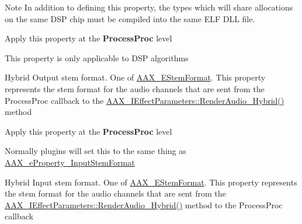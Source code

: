 \begin{Desc}
\begin{description}
\begin{DoxyNote}{Note}
In addition to defining this property, the types which will share allocations on the same D\+S\+P chip must be compiled into the same E\+L\+F D\+L\+L file.
\end{DoxyNote}
\begin{DoxyItemize}
\item Apply this property at the {\bfseries Process\+Proc} level \item This property is only applicable to D\+S\+P algorithms \end{DoxyItemize}
\item[{\em 
\hypertarget{a00283_ga6571f4e41a5dd06e4067249228e2249eac30a4e73772e37267dfef39ae3122705}{}A\+A\+X\+\_\+e\+Property\+\_\+\+Hybrid\+Output\+Stem\+Format\label{a00283_ga6571f4e41a5dd06e4067249228e2249eac30a4e73772e37267dfef39ae3122705}
}]Hybrid Output stem format. One of \hyperlink{a00206_ad8af5ef008b2bd478add9a0acb0a1d85}{A\+A\+X\+\_\+\+E\+Stem\+Format}. This property represents the stem format for the audio channels that are sent from the Process\+Proc callback to the \hyperlink{a00335_gae6139041de22f51f3146d26a01c54c1b}{A\+A\+X\+\_\+\+I\+Effect\+Parameters\+::\+Render\+Audio\+\_\+\+Hybrid()} method

\begin{DoxyItemize}
\item Apply this property at the {\bfseries Process\+Proc} level \item Normally plugins will set this to the same thing as \hyperlink{a00283_a6571f4e41a5dd06e4067249228e2249eadebf03028b758123965a8b988fa2df99}{A\+A\+X\+\_\+e\+Property\+\_\+\+Input\+Stem\+Format} \end{DoxyItemize}
\item[{\em 
\hypertarget{a00283_ga6571f4e41a5dd06e4067249228e2249ea33a950bc2e02d38fc3be0a0ad8cc89b1}{}A\+A\+X\+\_\+e\+Property\+\_\+\+Hybrid\+Input\+Stem\+Format\label{a00283_ga6571f4e41a5dd06e4067249228e2249ea33a950bc2e02d38fc3be0a0ad8cc89b1}
}]Hybrid Input stem format. One of \hyperlink{a00206_ad8af5ef008b2bd478add9a0acb0a1d85}{A\+A\+X\+\_\+\+E\+Stem\+Format}. This property represents the stem format for the audio channels that are sent from the \hyperlink{a00335_gae6139041de22f51f3146d26a01c54c1b}{A\+A\+X\+\_\+\+I\+Effect\+Parameters\+::\+Render\+Audio\+\_\+\+Hybrid()} method to the Process\+Proc callback


\end{description}
\end{Desc}
